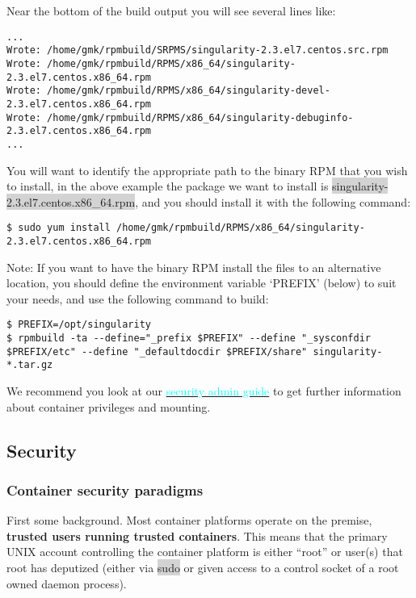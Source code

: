 \documentclass[a4paper]{article}
\begin{document}
Near the bottom of the build output you will see several lines like:


\begin{lstlisting}[frame=single]
...
Wrote: /home/gmk/rpmbuild/SRPMS/singularity-2.3.el7.centos.src.rpm
Wrote: /home/gmk/rpmbuild/RPMS/x86_64/singularity-2.3.el7.centos.x86_64.rpm
Wrote: /home/gmk/rpmbuild/RPMS/x86_64/singularity-devel-2.3.el7.centos.x86_64.rpm
Wrote: /home/gmk/rpmbuild/RPMS/x86_64/singularity-debuginfo-2.3.el7.centos.x86_64.rpm
...
\end{lstlisting}

You will want to identify the appropriate path to the binary RPM that you wish to install, in the above example the package we want to install is \colorbox{lightgray}{singularity-2.3.el7.centos.x86\_64.rpm}, and you should install it with the following command: 
\begin{lstlisting}[frame=single]
$ sudo yum install /home/gmk/rpmbuild/RPMS/x86_64/singularity-2.3.el7.centos.x86_64.rpm
\end{lstlisting}

Note: If you want to have the binary RPM install the files to an alternative location, you should define the environment variable ‘PREFIX’ (below) to suit your needs, and use the following command to build:

\begin{lstlisting}[frame=single]
$ PREFIX=/opt/singularity
$ rpmbuild -ta --define="_prefix $PREFIX" --define "_sysconfdir $PREFIX/etc" --define "_defaultdocdir $PREFIX/share" singularity-*.tar.gz
\end{lstlisting}

We recommend you look at our \hyperref[sec:security]{{\textcolor{cyan}{security admin guide}}} to get further information about container privileges and mounting.

\subsection{Security}
\label{sec:security}
\subsubsection{Container security paradigms}

First some background. Most container platforms operate on the premise, \textbf{trusted users running trusted containers}. This means that the primary UNIX account controlling the container platform is either “root” or user(s) that root has deputized (either via \colorbox{lightgray}{sudo} or given access to a control socket of a root owned daemon process).\\[0.1in]
\end{document}
